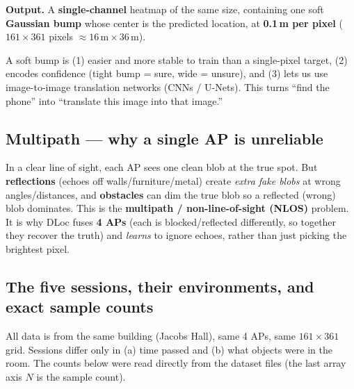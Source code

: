 \documentclass[11pt]{article}
\begin{document}
\textbf{Output.} A \textbf{single-channel} heatmap of the same size, containing one soft
\textbf{Gaussian bump} whose center is the predicted location, at \textbf{0.1\,m per pixel}
($161\times361$ pixels $\approx 16\,\text{m}\times36\,\text{m}$).

\begin{keybox}
A soft bump is (1) easier and more stable to train than a single-pixel target, (2) encodes
confidence (tight bump = sure, wide = unsure), and (3) lets us use image-to-image translation
networks (CNNs / U-Nets). This turns ``find the phone'' into ``translate this image into that
image.''
\end{keybox}

\subsection*{Multipath --- why a single AP is unreliable}
In a clear line of sight, each AP sees one clean blob at the true spot. But \textbf{reflections}
(echoes off walls/furniture/metal) create \emph{extra fake blobs} at wrong angles/distances, and
\textbf{obstacles} can dim the true blob so a reflected (wrong) blob dominates. This is the
\textbf{multipath / non-line-of-sight (NLOS)} problem. It is why DLoc fuses \textbf{4 APs} (each is
blocked/reflected differently, so together they recover the truth) and \emph{learns} to ignore
echoes, rather than just picking the brightest pixel.

\subsection*{The five sessions, their environments, and exact sample counts}
All data is from the same building (Jacobs Hall), same 4 APs, same $161\times361$ grid. Sessions
differ only in (a) time passed and (b) what objects were in the room. The counts below were read
directly from the dataset files (the last array axis $N$ is the sample count).
\end{document}
